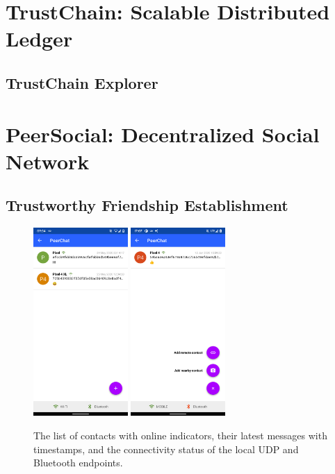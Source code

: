 \section{TrustChain: Scalable Distributed Ledger}

\subsection{TrustChain Explorer}

\section{PeerSocial: Decentralized Social Network}

\subsection{Trustworthy Friendship Establishment}

\begin{figure}
    \centering
    \includegraphics[width=0.32\textwidth]{screens/superapp/contacts}
    \includegraphics[width=0.32\textwidth]{screens/superapp/contacts_menu}
    \caption{The list of contacts with online indicators, their latest messages with timestamps, and the connectivity status of the local UDP and Bluetooth endpoints.}
    \label{manyverse}
\end{figure}


